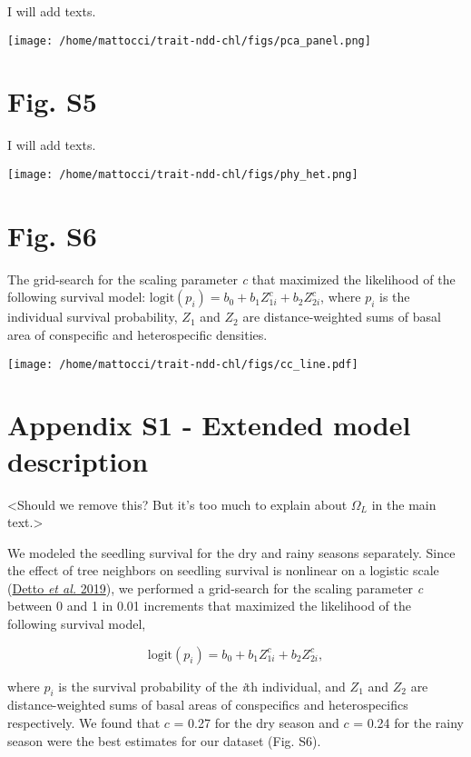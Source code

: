 \documentclass[
  12pt,
  letterpaper,
  DIV=11,
  numbers=noendperiod]{scrartcl}
\begin{document}
I will add texts.

\texttt{[image: /home/mattocci/trait-ndd-chl/figs/pca\_panel.png]}

\newpage

\hypertarget{fig.-s5}{%
\section{Fig. S5}\label{fig.-s5}}

I will add texts.

\texttt{[image: /home/mattocci/trait-ndd-chl/figs/phy\_het.png]}

\newpage

\hypertarget{fig.-s6}{%
\section{Fig. S6}\label{fig.-s6}}

The grid-search for the scaling parameter \emph{c} that maximized the
likelihood of the following survival model:
\(\mathrm{logit}(p_i) = b_0 + b_1 Z_{1i}^c + b_2 Z_{2i}^c\), where
\(p_i\) is the individual survival probability, \(Z_1\) and \(Z_2\) are
distance-weighted sums of basal area of conspecific and heterospecific
densities.

\texttt{[image: /home/mattocci/trait-ndd-chl/figs/cc\_line.pdf]}

\newpage

\hypertarget{appendix-s1---extended-model-description}{%
\section{Appendix S1 - Extended model
description}\label{appendix-s1---extended-model-description}}

\textless Should we remove this? But it's too much to explain about
\(\Omega_L\) in the main text.\textgreater{}

We modeled the seedling survival for the dry and rainy seasons
separately. Since the effect of tree neighbors on seedling survival is
nonlinear on a logistic scale (\protect\hyperlink{ref-Detto2019}{Detto
\emph{et al.} 2019}), we performed a grid-search for the scaling
parameter \emph{c} between 0 and 1 in 0.01 increments that maximized the
likelihood of the following survival model,

\[
\mathrm{logit}(p_i) = b_0 + b_1 Z_{1i}^c + b_2 Z_{2i}^c,
\]

where \(p_i\) is the survival probability of the \emph{i}th individual,
and \(Z_1\) and \(Z_2\) are distance-weighted sums of basal areas of
conspecifics and heterospecifics respectively. We found that \(c\) =
0.27 for the dry season and \(c\) = 0.24 for the rainy season were the
best estimates for our dataset (Fig. S6).
\end{document}
